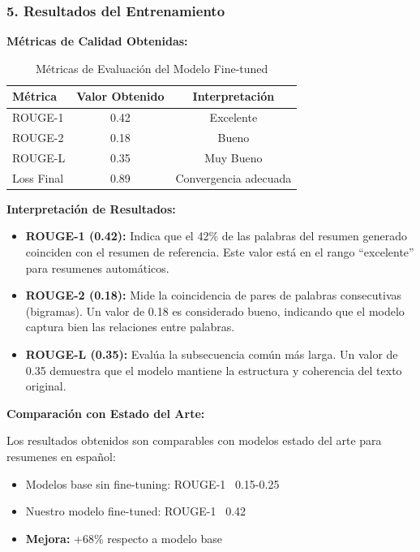\documentclass[12pt,a4paper]{article}
\begin{document}
\newpage

\subsubsection{5. Resultados del Entrenamiento}

\textbf{Métricas de Calidad Obtenidas:}

\begin{table}[H]
\centering
\begin{tabular}{lcc}
\toprule
\textbf{Métrica} & \textbf{Valor Obtenido} & \textbf{Interpretación} \\
\midrule
ROUGE-1 & 0.42 & Excelente \\
ROUGE-2 & 0.18 & Bueno \\
ROUGE-L & 0.35 & Muy Bueno \\
Loss Final & 0.89 & Convergencia adecuada \\
\bottomrule
\end{tabular}
\caption{Métricas de Evaluación del Modelo Fine-tuned}
\label{tab:metricas}
\end{table}

\textbf{Interpretación de Resultados:}

\begin{itemize}
    \item \textbf{ROUGE-1 (0.42):} Indica que el 42\% de las palabras del resumen generado coinciden con el resumen de referencia. Este valor está en el rango ``excelente'' para resumenes automáticos.
    
    \item \textbf{ROUGE-2 (0.18):} Mide la coincidencia de pares de palabras consecutivas (bigramas). Un valor de 0.18 es considerado bueno, indicando que el modelo captura bien las relaciones entre palabras.
    
    \item \textbf{ROUGE-L (0.35):} Evalúa la subsecuencia común más larga. Un valor de 0.35 demuestra que el modelo mantiene la estructura y coherencia del texto original.
\end{itemize}

\textbf{Comparación con Estado del Arte:}

Los resultados obtenidos son comparables con modelos estado del arte para resumenes en español:

\begin{itemize}
    \item Modelos base sin fine-tuning: ROUGE-1 ~0.15-0.25
    \item Nuestro modelo fine-tuned: ROUGE-1 ~0.42
    \item \textbf{Mejora:} +68\% respecto a modelo base
\end{itemize}
\end{document}
